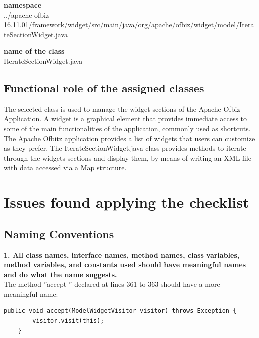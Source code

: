 \documentclass{article}
\begin{document}
\begin{flushleft}
\textbf{namespace}\\
../apache-ofbiz-16.11.01/framework/widget/src/main/java/org/apache/ofbiz/widget/model/IterateSectionWidget.java\\
\vspace{0.5cm}

\textbf{name of the class}\\
IterateSectionWidget.java

\vspace{1cm}
\subsection{Functional role of the assigned classes}
The selected class is used to manage the widget sections of the Apache Ofbiz  Application. A widget is a graphical element that provides immediate access to some of the main functionalities of the application, commonly used as shortcuts. The Apache Ofbitz application provides a list of widgets that users can customize as they prefer. The IterateSectionWidget.java class provides methods to iterate through the widgets sections and display them, by means of writing an XML file with data accessed via a Map structure.   




\newpage{}

\section{Issues found applying the checklist}



\subsection{ Naming Conventions}
\textbf{1. All class names, interface names, method names, class variables, method variables, and constants used should have meaningful names and do what the name suggests.}\\
\vspace{0.5cm}
The method ''accept '' declared at lines 361 to 363 should have a more meaningful name:
\vspace{0.5cm}

\begin{lstlisting}
public void accept(ModelWidgetVisitor visitor) throws Exception {
        visitor.visit(this);
    } 
\end{lstlisting}
\vspace{0.5cm}



\end{flushleft}
\end{document}
